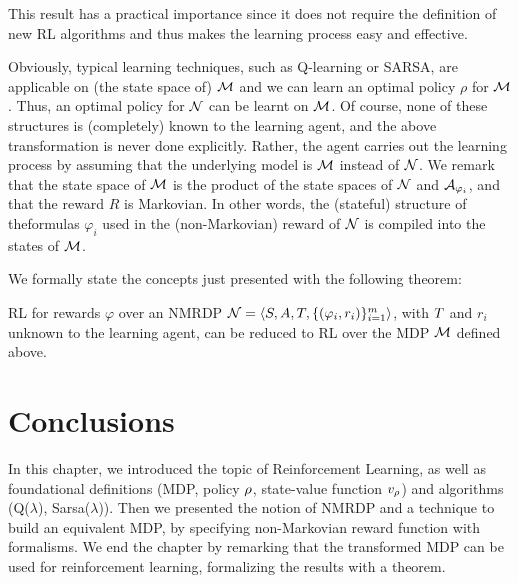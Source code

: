This result has a practical importance since it does not require the
definition of new RL algorithms and thus makes the learning
process easy and effective.

Obviously, typical learning techniques, such as Q-learning or SARSA, are applicable on (the state space of) $\mathcal{M}$ and we can learn an optimal policy $\rho$ for $\mathcal{M}$. Thus, an optimal policy for $\mathcal{N}$ can be learnt on $\mathcal{M}$. Of course, none of these structures is (completely) known to the learning agent, and the above transformation is never done explicitly. Rather, the agent carries out the learning process by assuming that the underlying model is $\mathcal{M}$ instead of $\mathcal{N}$. We remark that the state space of $\mathcal{M}$ is the product of the state spaces of $\mathcal{N}$ and $\mathcal{A}_{\varphi_i}$, and that the reward $R$ is Markovian. In other words, the (stateful) structure of the\LLf formulas $\varphi_i$ used in the (non-Markovian) reward of $\mathcal{N}$ is compiled into the states of $\mathcal{M}$.

We formally state the concepts just presented with the following theorem:

\begin{theorem}\label{th:rl-for-llf-rewards}
RL for \LLf rewards $\varphi$ over an NMRDP
$\mathcal{N} = \langle S, A, T, \{(\varphi_i, r_i)\}^m_{i=1} \rangle$, with $T$ and $r_i$ unknown to
the learning agent, can be reduced to RL over the MDP $\mathcal{M}$
defined above.
\end{theorem}

\section{Conclusions}
In this chapter, we introduced the topic of Reinforcement Learning, as well as foundational definitions (MDP, policy $\rho$, state-value function $v_\rho$) and algorithms (Q($\lambda$), Sarsa($\lambda$)). Then we presented the notion of NMRDP and a technique to build an equivalent MDP, by specifying non-Markovian reward function with \LLf formalisms. We end the chapter by remarking that the transformed MDP can be used for reinforcement learning, formalizing the results with a theorem.
\endinput

